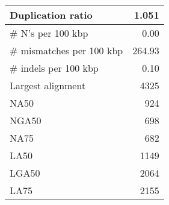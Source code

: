 \documentclass[12pt,a4paper]{article}
\begin{document}
\begin{table}[ht]
\begin{center}
\begin{tabular}{|l*{1}{|r}|}
Duplication ratio & 1.051 \\ \hline
\# N's per 100 kbp & 0.00 \\ \hline
\# mismatches per 100 kbp & 264.93 \\ \hline
\# indels per 100 kbp & 0.10 \\ \hline
Largest alignment & 4325 \\ \hline
NA50 & 924 \\ \hline
NGA50 & 698 \\ \hline
NA75 & 682 \\ \hline
LA50 & 1149 \\ \hline
LGA50 & 2064 \\ \hline
LA75 & 2155 \\ \hline
\end{tabular}
\end{center}
\end{table}
\end{document}
